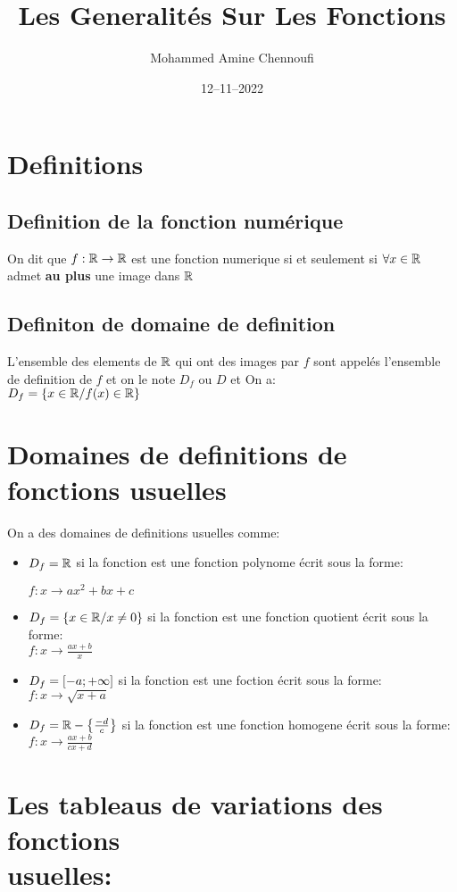 \documentclass[12pt]{extarticle}
\title{Les Generalités Sur Les Fonctions}
\date{12--11--2022}
\author{Mohammed Amine Chennoufi}
\begin{document}
\maketitle
\tableofcontents
\newpage

\section{Definitions }
\subsection{Definition de la fonction numérique}
On dit que $f: \mathbb{R} \rightarrow \mathbb{R}$ est une fonction numerique si et seulement si 
$\forall x \in \mathbb{R}$ admet \textbf{au plus} une image dans $\mathbb{R}$

\subsection{Definiton de domaine de definition}
L'ensemble des elements de $\mathbb{R}$ qui ont des images par $f$ sont appelés
l'ensemble de definition de $f$ et on le note $D_f$ ou $D$
et On a:\\
$D_f = \left\lbrace x \in \mathbb{R}/f(x) \in \mathbb{R} \right\rbrace$
\section{Domaines de definitions de fonctions usuelles}
On a des domaines de definitions usuelles comme: 
\begin{itemize}
	\item $D_f = \mathbb{R}$ si la fonction est une fonction polynome écrit sous la forme:

$f:x \rightarrow ax^2 + bx + c $
\item $D_f = \left\lbrace x \in \mathbb{R}/ x \neq 0 \right\rbrace$ si la fonction est une fonction quotient écrit sous la forme: \\
	$f:x \rightarrow \frac{ax+b}{x} $
\item $D_f = \left[ -a;+\infty \right]$ si la fonction est une foction écrit sous la forme: \\
	$f:x  \rightarrow \sqrt{x + a} $
\item $D_f = \mathbb{R} - \left\lbrace  \frac{-d}{c} \right\rbrace $ si la fonction est une fonction homogene écrit sous la forme:\\
	$f:x \rightarrow \displaystyle\frac{ax + b}{cx + d} $

\end{itemize}
\newpage
\section{Les tableaus de variations des fonctions \\usuelles:}
\end{document}
